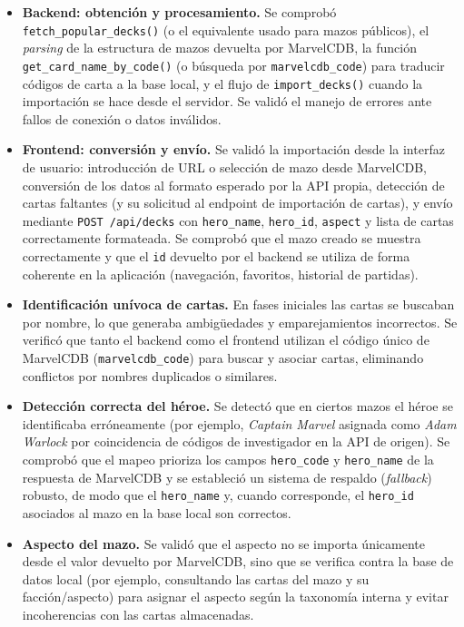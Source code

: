 \begin{itemize}
    \item \textbf{Backend: obtención y procesamiento.} Se comprobó \texttt{fetch\_popular\_decks()} (o el equivalente usado para mazos públicos), el \textit{parsing} de la estructura de mazos devuelta por MarvelCDB, la función \texttt{get\_card\_name\_by\_code()} (o búsqueda por \texttt{marvelcdb\_code}) para traducir códigos de carta a la base local, y el flujo de \texttt{import\_decks()} cuando la importación se hace desde el servidor. Se validó el manejo de errores ante fallos de conexión o datos inválidos.

    \item \textbf{Frontend: conversión y envío.} Se validó la importación desde la interfaz de usuario: introducción de URL o selección de mazo desde MarvelCDB, conversión de los datos al formato esperado por la API propia, detección de cartas faltantes (y su solicitud al endpoint de importación de cartas), y envío mediante \texttt{POST /api/decks} con \texttt{hero\_name}, \texttt{hero\_id}, \texttt{aspect} y lista de cartas correctamente formateada. Se comprobó que el mazo creado se muestra correctamente y que el \texttt{id} devuelto por el backend se utiliza de forma coherente en la aplicación (navegación, favoritos, historial de partidas).

    \item \textbf{Identificación unívoca de cartas.} En fases iniciales las cartas se buscaban por nombre, lo que generaba ambigüedades y emparejamientos incorrectos. Se verificó que tanto el backend como el frontend utilizan el código único de MarvelCDB (\texttt{marvelcdb\_code}) para buscar y asociar cartas, eliminando conflictos por nombres duplicados o similares.

    \item \textbf{Detección correcta del héroe.} Se detectó que en ciertos mazos el héroe se identificaba erróneamente (por ejemplo, \textit{Captain Marvel} asignada como \textit{Adam Warlock} por coincidencia de códigos de investigador en la API de origen). Se comprobó que el mapeo prioriza los campos \texttt{hero\_code} y \texttt{hero\_name} de la respuesta de MarvelCDB y se estableció un sistema de respaldo (\textit{fallback}) robusto, de modo que el \texttt{hero\_name} y, cuando corresponde, el \texttt{hero\_id} asociados al mazo en la base local son correctos.

    \item \textbf{Aspecto del mazo.} Se validó que el aspecto no se importa únicamente desde el valor devuelto por MarvelCDB, sino que se verifica contra la base de datos local (por ejemplo, consultando las cartas del mazo y su facción/aspecto) para asignar el aspecto según la taxonomía interna y evitar incoherencias con las cartas almacenadas.


\end{itemize}
